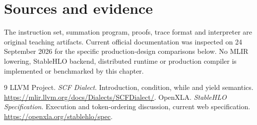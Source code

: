 \section*{Sources and evidence}
The instruction set, summation program, proofs, trace format and interpreter
are original teaching artifacts. Current official documentation was inspected
on 24 September 2026 for the specific production-design comparisons below.
No MLIR lowering, StableHLO backend, distributed runtime or production compiler
is implemented or benchmarked by this chapter.
\begingroup\let\chapter\section
\begin{thebibliography}{9}
 LLVM Project. \emph{SCF Dialect}.
Introduction, condition, while and yield semantics.
\url{https://mlir.llvm.org/docs/Dialects/SCFDialect/}.
 OpenXLA. \emph{StableHLO Specification}.
Execution and token-ordering discussion, current web specification.
\url{https://openxla.org/stablehlo/spec}.
\end{thebibliography}\endgroup
